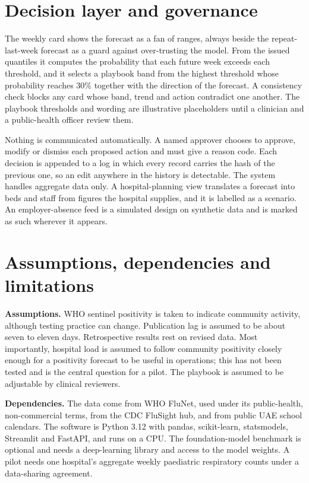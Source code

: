 \documentclass[11pt,a4paper]{article}
\begin{document}
\section{Decision layer and governance}

The weekly card shows the forecast as a fan of ranges, always beside the repeat-last-week forecast as a guard against over-trusting the model. From the issued quantiles it computes the probability that each future week exceeds each threshold, and it selects a playbook band from the highest threshold whose probability reaches 30\% together with the direction of the forecast. A consistency check blocks any card whose band, trend and action contradict one another. The playbook thresholds and wording are illustrative placeholders until a clinician and a public-health officer review them.

Nothing is communicated automatically. A named approver chooses to approve, modify or dismiss each proposed action and must give a reason code. Each decision is appended to a log in which every record carries the hash of the previous one, so an edit anywhere in the history is detectable. The system handles aggregate data only. A hospital-planning view translates a forecast into beds and staff from figures the hospital supplies, and it is labelled as a scenario. An employer-absence feed is a simulated design on synthetic data and is marked as such wherever it appears.

\section{Assumptions, dependencies and limitations}
\label{sec:assumptions}

\textbf{Assumptions.} WHO sentinel positivity is taken to indicate community activity, although testing practice can change. Publication lag is assumed to be about seven to eleven days. Retrospective results rest on revised data. Most importantly, hospital load is assumed to follow community positivity closely enough for a positivity forecast to be useful in operations; this has not been tested and is the central question for a pilot. The playbook is assumed to be adjustable by clinical reviewers.

\textbf{Dependencies.} The data come from WHO FluNet, used under its public-health, non-commercial terms, from the CDC FluSight hub, and from public UAE school calendars. The software is Python 3.12 with pandas, scikit-learn, statsmodels, Streamlit and FastAPI, and runs on a CPU. The foundation-model benchmark is optional and needs a deep-learning library and access to the model weights. A pilot needs one hospital's aggregate weekly paediatric respiratory counts under a data-sharing agreement.
\end{document}
